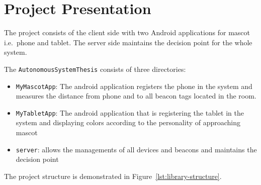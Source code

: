 \section{Project Presentation}
\label{sec:project-presentation}
The project consists of the client side with two Android applications for mascot i.e.\ phone and tablet.
The server side maintains the decision point for the whole system.

The \texttt{AutonomousSystemThesis} consists of three directories:

\begin{itemize}
    \item \texttt{MyMascotApp}: The android application registers the phone in the system and measures the distance
    from phone and to all beacon tags located in the room.
    \item \texttt{MyTabletApp}: The android application that is registering the tablet in the system and displaying colors according to the personality of approaching mascot
    \item \texttt{server}: allows the managements of all devices and beacons and maintains the decision point
\end{itemize}

The project structure is demonstrated in Figure~\ref{lst:library-structure}.

